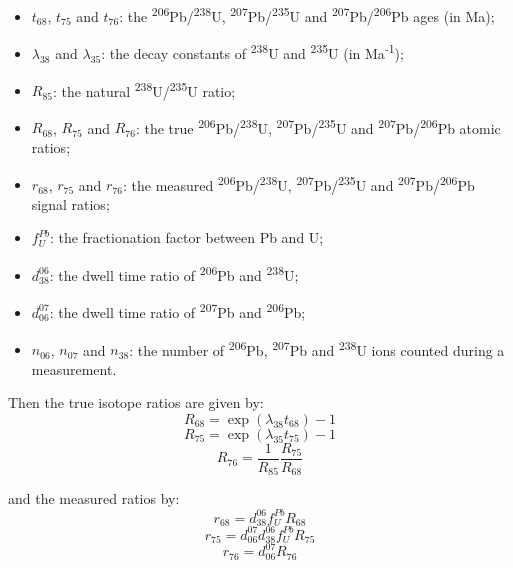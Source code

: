 \documentclass[gchron, manuscript]{copernicus}
\begin{document}
\begin{itemize}
\item $t_{68}$, $t_{75}$ and $t_{76}$: the
  \textsuperscript{206}Pb/\textsuperscript{238}U,
  \textsuperscript{207}Pb/\textsuperscript{235}U and
  \textsuperscript{207}Pb/\textsuperscript{206}Pb ages (in Ma);
\item $\lambda_{38}$ and $\lambda_{35}$: the decay constants of
  \textsuperscript{238}U and \textsuperscript{235}U (in
  Ma\textsuperscript{-1});
\item $R_{85}$: the natural
  \textsuperscript{238}U/\textsuperscript{235}U ratio;
\item $R_{68}$, $R_{75}$ and $R_{76}$: the true
  \textsuperscript{206}Pb/\textsuperscript{238}U,
  \textsuperscript{207}Pb/\textsuperscript{235}U and
  \textsuperscript{207}Pb/\textsuperscript{206}Pb atomic ratios;
\item $r_{68}$, $r_{75}$ and $r_{76}$: the measured
  \textsuperscript{206}Pb/\textsuperscript{238}U,
  \textsuperscript{207}Pb/\textsuperscript{235}U and
  \textsuperscript{207}Pb/\textsuperscript{206}Pb signal ratios;
\item $f^{Pb}_{U}$: the fractionation factor between Pb and U;
\item $d^{06}_{38}$: the dwell time ratio of \textsuperscript{206}Pb
  and \textsuperscript{238}U;
\item $d^{07}_{06}$: the dwell time ratio of \textsuperscript{207}Pb
  and \textsuperscript{206}Pb;
\item $n_{06}$, $n_{07}$ and $n_{38}$: the number of
  \textsuperscript{206}Pb, \textsuperscript{207}Pb and
  \textsuperscript{238}U ions counted during a measurement.
\end{itemize}

Then the true isotope ratios are given by:
\begin{equation}
  R_{68} = \exp(\lambda_{38}t_{68})-1
\end{equation}
\begin{equation}
  R_{75} = \exp(\lambda_{35}t_{75})-1
\end{equation}
\begin{equation}  
   R_{76} = \frac{1}{R_{85}}\frac{R_{75}}{R_{68}}
\end{equation}

and the measured ratios by:
\begin{equation}
    r_{68} = d^{06}_{38}f^{Pb}_{U}R_{68}
\end{equation}
\begin{equation}
    r_{75} = d^{07}_{06}d^{06}_{38}f^{Pb}_{U}R_{75}
\end{equation}
\begin{equation}  
    r_{76} = d^{07}_{06}R_{76}
\end{equation}
\end{document}
